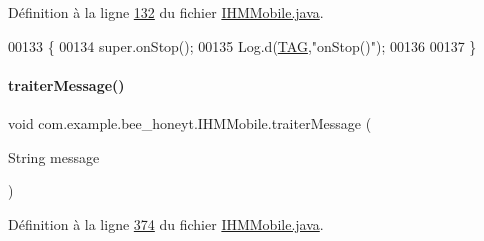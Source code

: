 Définition à la ligne \hyperlink{_i_h_m_mobile_8java_source_l00132}{132} du fichier \hyperlink{_i_h_m_mobile_8java_source}{I\+H\+M\+Mobile.\+java}.


\begin{DoxyCode}
00133     \{
00134         super.onStop();
00135         Log.d(\hyperlink{classcom_1_1example_1_1bee__honeyt_1_1_i_h_m_mobile_a366987bf9bb2ed1010b2f967d4efa263}{TAG},\textcolor{stringliteral}{"onStop()"});
00136 
00137     \}
\end{DoxyCode}
\mbox{\label{classcom_1_1example_1_1bee__honeyt_1_1_i_h_m_mobile_a4183e896e4eab05e7ca92735199425fa}} 
\paragraph{\texorpdfstring{traiter\+Message()}{traiterMessage()}}
{\footnotesize\ttfamily void com.\+example.\+bee\+\_\+honeyt.\+I\+H\+M\+Mobile.\+traiter\+Message (\begin{DoxyParamCaption}\item[{String}]{message }\end{DoxyParamCaption})\hspace{0.3cm}{\ttfamily [private]}}



Définition à la ligne \hyperlink{_i_h_m_mobile_8java_source_l00374}{374} du fichier \hyperlink{_i_h_m_mobile_8java_source}{I\+H\+M\+Mobile.\+java}.




